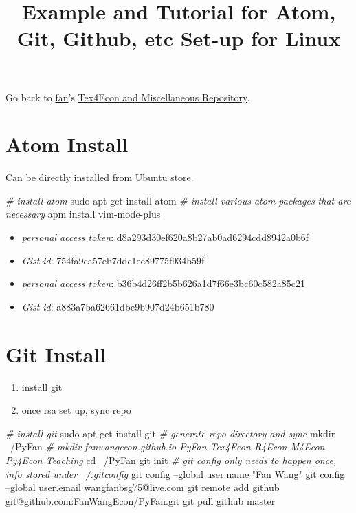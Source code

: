 \documentclass[]{article}
\title{Example and Tutorial for Atom, Git, Github, etc Set-up for Linux}
\author{}
\date{\vspace{-2.5em}}
\newenvironment{Shaded}{\begin{snugshade}}{\end{snugshade}}
\newcommand{\BuiltInTok}[1]{#1}
\newcommand{\CommentTok}[1]{\textcolor[rgb]{0.56,0.35,0.01}{\textit{#1}}}
\newcommand{\FunctionTok}[1]{\textcolor[rgb]{0.00,0.00,0.00}{#1}}
\newcommand{\NormalTok}[1]{#1}
\newcommand{\StringTok}[1]{\textcolor[rgb]{0.31,0.60,0.02}{#1}}
\providecommand{\tightlist}{%
  \setlength{\itemsep}{0pt}\setlength{\parskip}{0pt}}
\begin{document}
\maketitle

Go back to \href{http://fanwangecon.github.io/}{fan}'s
\href{http://fanwangecon.github.io/Tex4Econ/}{Tex4Econ and Miscellaneous
Repository}.

\hypertarget{atom-install}{%
\section{Atom Install}\label{atom-install}}

Can be directly installed from Ubuntu store.

\begin{Shaded}
\begin{Highlighting}[]
\CommentTok{# install atom}
\FunctionTok{sudo}\NormalTok{ apt-get install atom}
\CommentTok{# install various atom packages that are necessary}
\FunctionTok{apm}\NormalTok{ install vim-mode-plus}
\end{Highlighting}
\end{Shaded}

\begin{itemize}
\item
  \emph{personal access token}: d8a293d30ef620a8b27ab0ad6294cdd8942a0b6f
\item
  \emph{Gist id}: 754fa9ca57eb7ddc1ee89775f934b59f
\item
  \emph{personal access token}: b36b4d26ff2b5b626a1d7f66e3bc60c582a85c21
\item
  \emph{Gist id}: a883a7ba62661dbe9b907d24b651b780
\end{itemize}

\hypertarget{git-install}{%
\section{Git Install}\label{git-install}}

\begin{enumerate}
\def\labelenumi{\arabic{enumi}.}
\tightlist
\item
  install git
\item
  once rsa set up, sync repo
\end{enumerate}

\begin{Shaded}
\begin{Highlighting}[]
\CommentTok{# install git}
\FunctionTok{sudo}\NormalTok{ apt-get install git}
\CommentTok{# generate repo directory and sync}
\FunctionTok{mkdir}\NormalTok{ ~/PyFan}
\CommentTok{# mkdir fanwangecon.github.io PyFan Tex4Econ R4Econ M4Econ Py4Econ Teaching}
\BuiltInTok{cd}\NormalTok{ ~/PyFan}
\FunctionTok{git}\NormalTok{ init}
\CommentTok{# git config only needs to happen once, info stored under ~/.gitconfig}
\FunctionTok{git}\NormalTok{ config --global user.name }\StringTok{"Fan Wang"}
\FunctionTok{git}\NormalTok{ config --global user.email wangfanbsg75@live.com}
\FunctionTok{git}\NormalTok{ remote add github git@github.com:FanWangEcon/PyFan.git}
\FunctionTok{git}\NormalTok{ pull github master}
\end{Highlighting}
\end{Shaded}
\end{document}
